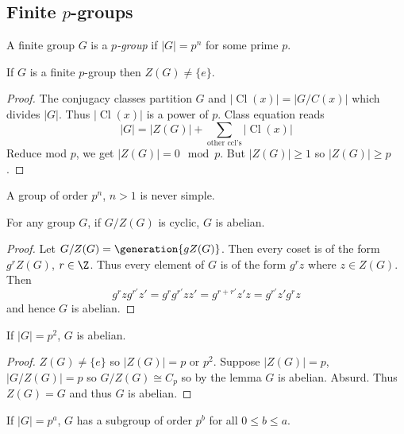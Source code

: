 \documentclass[a4paper]{article}
\theoremstyle{definition}
\DeclareMathOperator{\Cl}{Cl}
\begin{document}
\subsection{Finite \texorpdfstring{\(p\)}{p}-groups}

A finite group \(G\) is a \emph{\(p\)-group} if \(|G| = p^n\) for some prime \(p\).

\begin{theorem}
  If \(G\) is a finite \(p\)-group then \(Z(G) \neq \{e\}\).
\end{theorem}

\begin{proof}
  The conjugacy classes partition \(G\) and \(|\Cl(x)| = |G/C(x)|\) which divides \(|G|\). Thus \(|\Cl(x)|\) is a power of \(p\). Class equation reads
  \[
    |G| = |Z(G)| + \sum_{\text{other ccl's}} |\Cl(x)|
  \]
  Reduce mod \(p\), we get \(|Z(G)| = 0 \mod p\). But \(|Z(G)| \geq 1\) so \(|Z(G)| \geq p\).
\end{proof}

\begin{corollary}
  A group of order \(p^n\), \(n > 1\) is never simple.
\end{corollary}

\begin{lemma}
  For any group \(G\), if \(G/Z(G)\) is cyclic, \(G\) is abelian.
\end{lemma}

\begin{proof}
  Let \(G/Z(G) = \generation{gZ(G)}\). Then every coset is of the form \(g^rZ(G)\), \(r \in \Z\). Thus every element of \(G\) is of the form \(g^rz\) where \(z \in Z(G)\). Then
  \[
    g^rzg^{r'}z' = g^rg^{r'}zz' = g^{r + r'} z'z = g^{r'}z'g^rz
  \]
  and hence \(G\) is abelian.
\end{proof}

\begin{corollary}
  If \(|G| = p^2\), \(G\) is abelian.
\end{corollary}

\begin{proof}
  \(Z(G) \neq \{e\}\) so \(|Z(G)| = p\) or \(p^2\). Suppose \(|Z(G)| = p\), \(|G/Z(G)| = p\) so \(G/Z(G) \cong C_p\) so by the lemma \(G\) is abelian. Absurd. Thus \(Z(G) = G\) and thus \(G\) is abelian.
\end{proof}

\begin{theorem}
  If \(|G| = p^a\), \(G\) has a subgroup of order \(p^b\) for all \(0 \leq b \leq a\).
\end{theorem}
\end{document}
